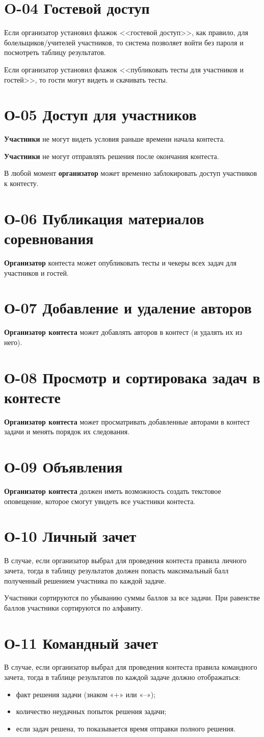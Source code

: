 \documentclass{book}
\newcommand{\newcard}[1]{\newpage \section*{#1}}
\begin{document}
\newcard{O-04 Гостевой доступ}
	Если организатор установил флажок <<гостевой доступ>>, как правило, для болельщиков/учителей участников, то система позволяет войти без пароля и посмотреть таблицу результатов.
	
	Если организатор установил флажок <<публиковать тесты для участников и гостей>>, то гости могут видеть и скачивать тесты.


\newcard{О-05 Доступ для участников}
	\textbf{Участники} не могут видеть условия раньше времени начала контеста. 
	
	\textbf{Участники} не могут отправлять решения после окончания контеста. 
	
	В любой момент \textbf{организатор} может временно заблокировать доступ участников к контесту. 


\newcard{О-06 Публикация материалов соревнования}
	\textbf{Организатор} контеста может опубликовать тесты и чекеры всех задач для участников и гостей.


\newcard{О-07 Добавление и удаление авторов}
	\textbf{Организатор контеста} может добавлять авторов в контест (и удалять их из него). 


\newcard{О-08 Просмотр и сортировака задач в контесте}
	\textbf{Организатор контеста} может просматривать добавленные авторами в контест задачи и менять порядок их следования.


\newcard{О-09 Объявления}
	\textbf{Организатор контеста} должен иметь возможность создать текстовое оповещение, которое смогут увидеть все участники контеста.


\newcard{О-10 Личный зачет}
	В случае, если организатор выбрал для проведения контеста правила личного зачета, тогда в таблицу результатов должен попасть максимальный балл полученный решением участника по каждой задаче.

	Участники сортируются по убыванию суммы баллов за все задачи. При равенстве баллов участники сортируются по алфавиту.

\newcard{О-11 Командный зачет}
	В случае, если организатор выбрал для проведения контеста правила командного зачета, тогда в таблице результатов по каждой задаче должно отображаться:
	\begin{itemize}
	\item факт решения задачи (знаком «+» или «­–»);
	\item количество неудачных попыток решения задачи;
	\item если задач решена, то показывается время отправки полного решения.
	\end{itemize}
	
\end{document}
